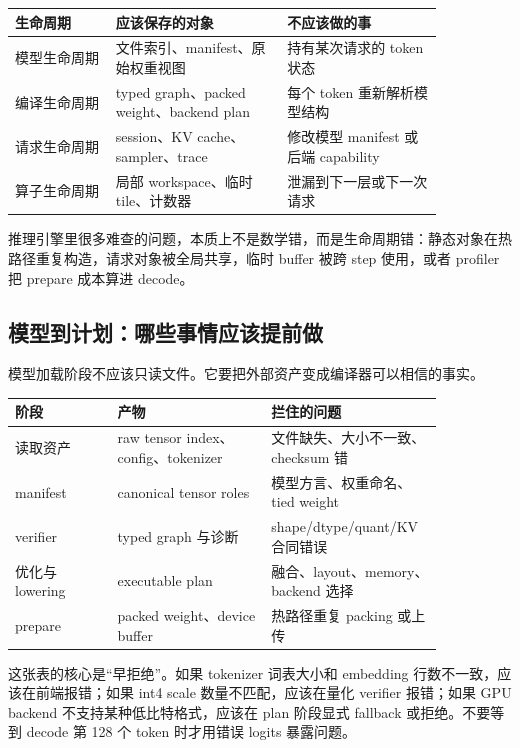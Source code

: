 \begin{center}
\begin{tabular}{p{0.20\linewidth}p{0.34\linewidth}p{0.31\linewidth}}
\toprule
生命周期 & 应该保存的对象 & 不应该做的事 \\
\midrule
模型生命周期 & 文件索引、manifest、原始权重视图 & 持有某次请求的 token 状态 \\
编译生命周期 & typed graph、packed weight、backend plan & 每个 token 重新解析模型结构 \\
请求生命周期 & session、KV cache、sampler、trace & 修改模型 manifest 或后端 capability \\
算子生命周期 & 局部 workspace、临时 tile、计数器 & 泄漏到下一层或下一次请求 \\
\bottomrule
\end{tabular}
\end{center}

\begin{warningbox}
推理引擎里很多难查的问题，本质上不是数学错，而是生命周期错：静态对象在热路径重复构造，请求对象被全局共享，临时 buffer 被跨 step 使用，或者 profiler 把 prepare 成本算进 decode。
\end{warningbox}

\subsection{模型到计划：哪些事情应该提前做}

模型加载阶段不应该只读文件。它要把外部资产变成编译器可以相信的事实。

\begin{center}
\begin{tabular}{p{0.22\linewidth}p{0.33\linewidth}p{0.30\linewidth}}
\toprule
阶段 & 产物 & 拦住的问题 \\
\midrule
读取资产 & raw tensor index、config、tokenizer & 文件缺失、大小不一致、checksum 错 \\
manifest & canonical tensor roles & 模型方言、权重命名、tied weight \\
verifier & typed graph 与诊断 & shape/dtype/quant/KV 合同错误 \\
优化与 lowering & executable plan & 融合、layout、memory、backend 选择 \\
prepare & packed weight、device buffer & 热路径重复 packing 或上传 \\
\bottomrule
\end{tabular}
\end{center}

这张表的核心是“早拒绝”。如果 tokenizer 词表大小和 embedding 行数不一致，应该在前端报错；如果 int4 scale 数量不匹配，应该在量化 verifier 报错；如果 GPU backend 不支持某种低比特格式，应该在 plan 阶段显式 fallback 或拒绝。不要等到 decode 第 128 个 token 时才用错误 logits 暴露问题。

